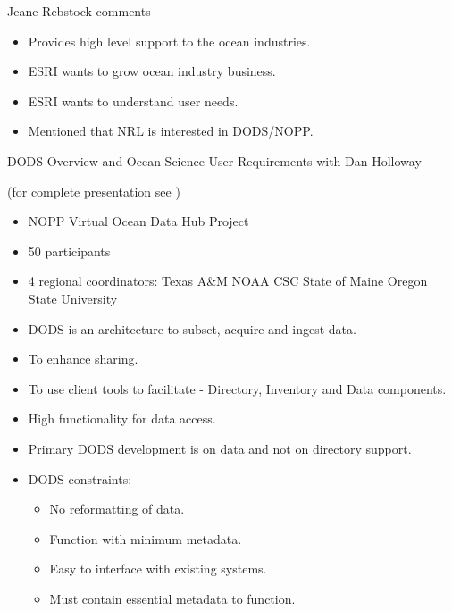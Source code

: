 Jeane Rebstock comments
\begin{itemize}
\item Provides high level support to the ocean industries.
\item ESRI wants to grow ocean industry business.
\item ESRI wants to understand user needs.
\item Mentioned that NRL is interested in DODS/NOPP.
\end{itemize}


DODS Overview and Ocean Science User Requirements with Dan 
Holloway 

(for complete presentation see  )
 
\begin{itemize}
\item NOPP Virtual Ocean Data Hub Project
\item 50 participants
\item 4 regional coordinators:
Texas A\&M
NOAA CSC
State of Maine
Oregon State University
\end{itemize}

\begin{itemize}
\item DODS is an architecture to subset, acquire and ingest data.
\item To enhance sharing.
\item To use client tools to facilitate - Directory, Inventory and Data components.
\item High functionality for data access.
\item Primary DODS development is on data and not on directory support.
\item DODS constraints:
\begin{itemize}
\item No reformatting of data.
\item Function with minimum metadata.
\item Easy to interface with existing systems.
\item Must contain essential metadata to function.
\end{itemize}
\end{itemize}

